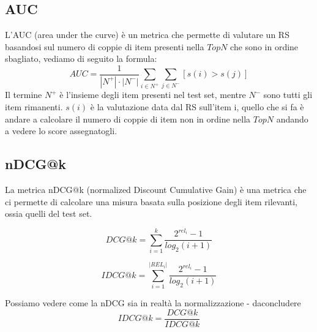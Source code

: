 \subsection{AUC}
L'AUC (area under the curve) è un metrica che permette di valutare un RS basandosi sul numero di coppie di item presenti nella $TopN$ che sono in ordine sbagliato, vediamo di seguito la formula:
$$AUC = \frac{1}{|N^{+}|\cdot|N^{-}|}\sum_{i \in N^{+}} \sum_{j \in N^{-}} [s(i) > s(j)]$$
Il termine $N^{+}$ è l'insieme degli item presenti nel test set, mentre $N^{-}$ sono tutti gli item rimanenti. $s(i)$ è la valutazione data dal RS sull'item i, quello che si fa è andare a calcolare il numero di coppie di item non in ordine nella $TopN$ andando a vedere lo score assegnatogli.

\subsection{nDCG@k}
La metrica nDCG@k (normalized Discount Cumulative Gain) è una metrica che ci permette di calcolare una misura basata sulla posizione degli item rilevanti, ossia quelli del test set.

\begin{minipage}[H]{0.5\textwidth}
	$$DCG@k = \sum_{i=1}^{k} \frac{2^{rel_i} - 1}{log_{2} (i + 1)}$$
\end{minipage}
\begin{minipage}[H]{0.5\textwidth}
	$$IDCG@k = \sum_{i=1}^{|REL_i|} \frac{2^{rel_i} - 1}{log_{2} (i + 1)}$$
\end{minipage}
Possiamo vedere come la nDCG sia in realtà la normalizzazione - daconcludere
$$IDCG@k = \frac{DCG@k}{IDCG@k}$$
